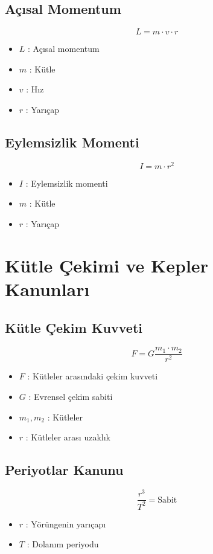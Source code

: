 \documentclass[a4paper, 11pt, titlepage]{article}
\begin{document}
\subsection{Açısal Momentum}
\[
L = m \cdot v \cdot r
\]
\begin{itemize}
  \item $L$ : Açısal momentum
  \item $m$ : Kütle
  \item $v$ : Hız
  \item $r$ : Yarıçap
\end{itemize}


\subsection{Eylemsizlik Momenti}
\[
I = m \cdot r^2
\]
\begin{itemize}
  \item $I$ : Eylemsizlik momenti
  \item $m$ : Kütle
  \item $r$ : Yarıçap
\end{itemize}
\section[Kütle Çekimi ve Kepler Kanunları]{Kütle Çekimi ve Kepler \\Kanunları}
\subsection{Kütle Çekim Kuvveti}
\[
F = G \frac{m_1 \cdot m_2}{r^2}
\]
\begin{itemize}
  \item $F$ : Kütleler arasındaki çekim kuvveti
  \item $G$ : Evrensel çekim sabiti
  \item $m_1, m_2$ : Kütleler
  \item $r$ : Kütleler arası uzaklık
\end{itemize}

\subsection{Periyotlar Kanunu}
\[
\frac{r^3}{T^2} = \mathrm{Sabit}
\]
\begin{itemize}
  \item $r$ : Yörüngenin yarıçapı
  \item $T$ : Dolanım periyodu
\end{itemize}
\end{document}
